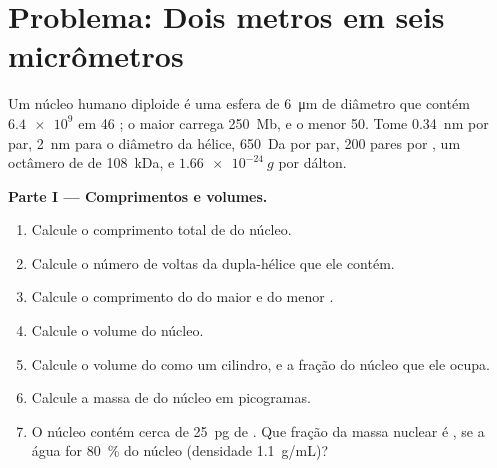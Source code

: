 \section{Problema: Dois metros em seis micrômetros}

\begin{problem}
\label{pb:b1:genomes:1}
Um núcleo humano diploide é uma esfera de \qty{6}{\micro m} de diâmetro
que contém $\num{6.4e9}$  em 46 ; o maior
 carrega \qty{250}{Mb}, e o menor \qty{50}{}. Tome
\qty{0.34}{nm} por par, \qty{2}{nm} para o diâmetro da hélice,
\qty{650}{Da} por par, \num{200} pares por , um octâmero de
 de \qty{108}{kDa}, e $\qty{1.66e-24}{g}$ por dálton.

\medskip
\noindent\textbf{Parte I --- Comprimentos e volumes.}
\begin{enumerate}
  \item Calcule o comprimento total de  do núcleo.
  \item Calcule o número de voltas da dupla-hélice que ele contém.
  \item Calcule o comprimento do  do maior e do menor .
  \item Calcule o volume do núcleo.
  \item Calcule o volume do  como um cilindro, e a fração do núcleo
        que ele ocupa.
  \item Calcule a massa de  do núcleo em picogramas.
  \item O núcleo contém cerca de \qty{25}{pg} de . Que fração da
        massa nuclear é , se a água for \qty{80}{\%} do núcleo
        (densidade \qty{1.1}{g/mL})?
\end{enumerate}


\end{problem}
